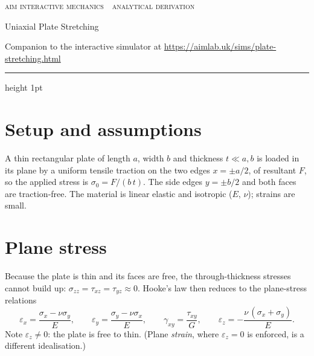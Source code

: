 \documentclass[10pt,a4paper]{article}
\begin{document}
{\footnotesize\textcolor{celdark}{\textsc{aim interactive mechanics \,\textperiodcentered\, analytical derivation}}}

{\LARGE Uniaxial Plate Stretching}

\textcolor{celdark}{\small Companion to the interactive simulator at
\url{https://aimlab.uk/sims/plate-stretching.html}}

\medskip
{\color{celline}\hrule height 1pt}

\section*{Setup and assumptions}
A thin rectangular plate of length $a$, width $b$ and thickness $t \ll a, b$ is
loaded in its plane by a uniform tensile traction on the two edges
$x = \pm a/2$, of resultant $F$, so the applied stress is
$\sigma_0 = F/(b\,t)$. The side edges $y = \pm b/2$ and both faces are
traction-free. The material is linear elastic and isotropic ($E$, $\nu$);
strains are small.

\section*{Plane stress}
Because the plate is thin and its faces are free, the through-thickness stresses
cannot build up: $\sigma_{zz} = \tau_{xz} = \tau_{yz} \approx 0$. Hooke's law
then reduces to the plane-stress relations
\begin{equation}
\varepsilon_x = \frac{\sigma_x - \nu \sigma_y}{E}, \qquad
\varepsilon_y = \frac{\sigma_y - \nu \sigma_x}{E}, \qquad
\gamma_{xy} = \frac{\tau_{xy}}{G}, \qquad
\varepsilon_z = -\frac{\nu\,(\sigma_x + \sigma_y)}{E}.
\end{equation}
Note $\varepsilon_z \neq 0$: the plate is free to thin. (Plane \emph{strain},
where $\varepsilon_z = 0$ is enforced, is a different idealisation.)
\end{document}

